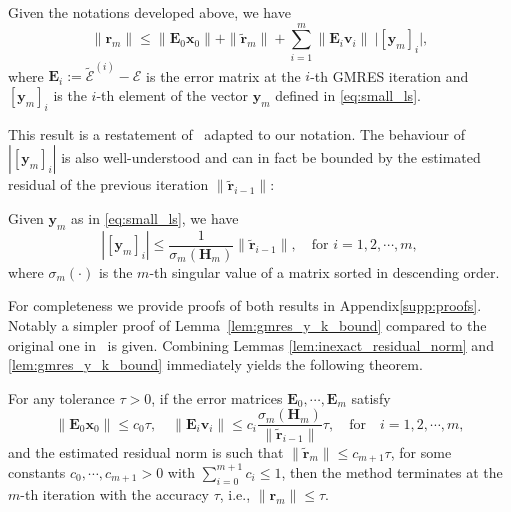 \documentclass[hidelinks,onefignum,onetabnum]{siamart250211}
\newcommand{\supplement}{Appendix\xspace}
\newcommand{\supplement}{Supplementary Material\xspace}
\begin{document}
\begin{lemma} \label{lem:inexact_residual_norm}
  Given the notations developed above, we have
  \begin{equation}\label{eq:inexact_residual_norm}
      \| \bm r_m \| \leq \| \bm E_0 \bm x_0 \| + \| \widetilde{\bm r}_m \| + \sum_{i=1}^m \| \bm E_i \bm v_i \| \ \big| \left[ \bm y_m \right]_i \big|,
  \end{equation}
  where $\bm E_i := \widetilde{\bm{\mathcal E}}^{(i)} - \bm{\mathcal E}$ is the error matrix at the $i$-th GMRES iteration and $\left[ \bm y_m \right]_i$ is the $i$-th element of the vector $\bm y_m$ defined in \eqref{eq:small_ls}. 
\end{lemma}
This result is a restatement of~\cite[Proposition 4.1]{simoncini2003theory} adapted to our notation.
The behaviour of $\left| \left[ \bm y_m \right]_i \right|$ is also well-understood
and can in fact be bounded by the estimated residual of the previous iteration
$\| \widetilde{\bm r}_{i-1} \|$:
\begin{lemma} \label{lem:gmres_y_k_bound}
  Given $\bm y_m$ as in \eqref{eq:small_ls}, we have
    \begin{equation} \label{eq:gmres_y_k_bound}
        \left| \left[ \bm y_m \right]_i \right| \leq \dfrac{1}{\sigma_{m}(\bm H_m)} \| \widetilde{\bm r}_{i-1} \|, \quad \text{for } i=1,2,\cdots, m,
    \end{equation}
    where $\sigma_{m}(\cdot)$ is the $m$-th singular value of a matrix sorted
    in descending order.
\end{lemma}
For completeness we provide proofs of both results in \supplement \ref{supp:proofs}.
Notably a simpler proof of Lemma~\ref{lem:gmres_y_k_bound} compared to the original one in~\cite{simoncini2003theory} is given.
Combining Lemmas \ref{lem:inexact_residual_norm} and \ref{lem:gmres_y_k_bound}
immediately yields the following theorem.
\begin{theorem}\label{thm:inexact_gmres}
    For any tolerance $\tau >0$,
    if the error matrices $\bm E_0, \cdots, \bm E_m$ satisfy
    \begin{equation}\label{eq:inexact_gmres_bound}
        \| \bm E_0 \bm x_0 \| \leq c_0\tau,\quad \|\bm E_i \bm v_i\| \leq c_i \dfrac{\sigma_m(\bm H_m)}{\|\widetilde{\bm r}_{i-1}\|}\tau, \quad \text{for} \quad i=1,2,\cdots, m,
    \end{equation}
    and the estimated residual norm is such that $\| \widetilde{\bm r}_m \|\leq c_{m+1}\tau$, for some constants $c_0, \cdots, c_{m+1} > 0$ with
  $\sum_{i=0}^{m+1} c_i \leq 1$, then the method terminates at the $m$-th iteration with the accuracy $\tau$, i.e., $\|\bm r_m\| \leq \tau$.
\end{theorem}
\end{document}
